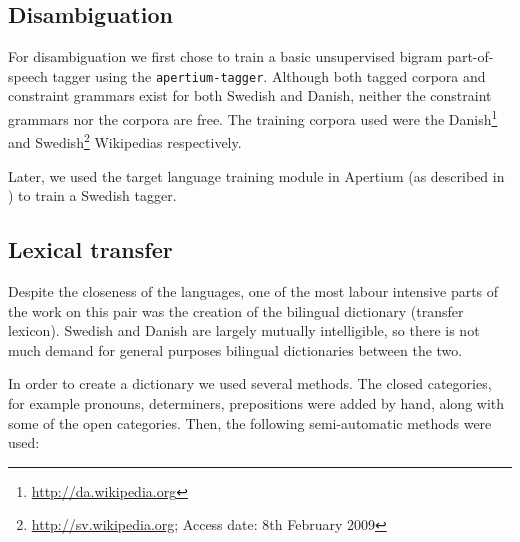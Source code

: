 \documentclass[11pt]{article}
\begin{document}
\subsection{Disambiguation}


For disambiguation we first chose to train a basic unsupervised bigram part-of-speech tagger
using the {\tt\small apertium-tagger}. Although both tagged corpora and constraint
grammars exist for both Swedish and Danish, neither the constraint grammars
nor the corpora are free. The training corpora used were the 
Danish\footnote{\url{http://da.wikipedia.org}} and Swedish\footnote{\url{http://sv.wikipedia.org}; 
Access date: 8th February 2009} Wikipedias respectively.

Later, we used the target language training module in Apertium (as described in \cite{sanchez2008})
to train a Swedish tagger.

\subsection{Lexical transfer}

Despite the closeness of the languages, one of the most labour intensive parts of 
the work on this pair was the creation of the bilingual dictionary (transfer 
lexicon). Swedish and Danish are largely mutually intelligible, so there is not 
much demand for general purposes bilingual dictionaries between the two.

In order to create a dictionary we used several methods. The closed categories, 
for example pronouns, determiners, prepositions were added by hand, along with some 
of the open categories. Then, the following semi-automatic methods were used:
\end{document}
